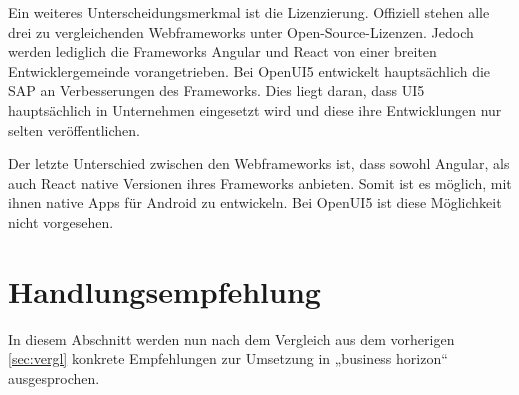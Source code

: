 Ein weiteres Unterscheidungsmerkmal ist die Lizenzierung. Offiziell stehen alle drei zu vergleichenden Webframeworks unter Open-Source-Lizenzen. Jedoch werden lediglich die Frameworks Angular und React von einer breiten Entwicklergemeinde vorangetrieben. Bei OpenUI5 entwickelt hauptsächlich die SAP an Verbesserungen des Frameworks. Dies liegt daran, dass UI5 hauptsächlich in Unternehmen eingesetzt wird und diese ihre Entwicklungen nur selten veröffentlichen. 

Der letzte Unterschied zwischen den Webframeworks ist, dass sowohl Angular, als auch React native Versionen ihres Frameworks anbieten. Somit ist es möglich, mit ihnen native Apps für Android zu entwickeln. Bei OpenUI5 ist diese Möglichkeit nicht vorgesehen.


\section{Handlungsempfehlung}\label{sec:empf}

In diesem Abschnitt werden nun nach dem Vergleich aus dem vorherigen \autoref{sec:vergl} konkrete Empfehlungen zur Umsetzung in „business horizon“ ausgesprochen.

